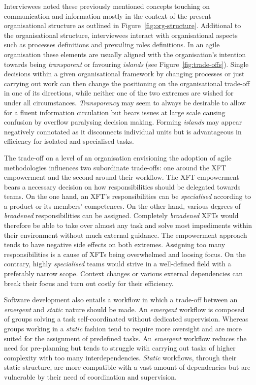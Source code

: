Interviewees noted these previously mentioned concepts touching on communication and information mostly in the context of the present organisational structure as outlined in Figure~\ref{fig:org-structure}. Additional to the organisational structure, interviewees interact with organisational aspects such as processes definitions and prevailing roles definitions. 
In an agile organisation these elements are usually aligned with the organisation's intention towards being \emph{transparent} or favouring \emph{islands} (see Figure~\ref{fig:trade-offs}).
Single decisions within a given organisational framework by changing processes or just carrying out work can then change the positioning on the organisational trade-off in one of its directions, while neither one of the two extremes are wished for under all circumstances. \emph{Transparency} may seem to always be desirable to allow for a fluent information circulation but bears issues at large scale causing confusion by overflow paralysing decision making. Forming \emph{islands} may appear negatively connotated as it disconnects individual units but is advantageous in efficiency for isolated and specialised tasks.

The trade-off on a level of an organisation envisioning the adoption of agile methodologies influences two subordinate trade-offs: one around the \ac{XFT} empowerment and the second around their workflow. The \ac{XFT} empowerment bears a necessary decision on how responsibilities should be delegated towards teams. On the one hand, an \ac{XFT}'s responsibilities can be \emph{specialised} according to a product or its members' competences. On the other hand, various degrees of \emph{broadened} responsibilities can be assigned. Completely \emph{broadened} \acp{XFT} would therefore be able to take over almost any task and solve most impediments within their environment without much external guidance. The empowerment approach tends to have negative side effects on both extremes. Assigning too many responsibilities is a cause of \acp{XFT} being overwhelmed and loosing focus. On the contrary, highly \emph{specialised} teams would strive in a well-defined field with a preferably narrow scope. Context changes or various external dependencies can break their focus and turn out costly for their efficiency.

Software development also entails a workflow in which a trade-off between an \emph{emergent} and \emph{static} nature should be made. An \emph{emergent} workflow is composed of groups solving a task self-coordinated without dedicated supervision. Whereas groups working in a \emph{static} fashion tend to require more oversight and are more suited for the assignment of predefined tasks. An \emph{emergent} workflow reduces the need for pre-planning but tends to struggle with carrying out tasks of higher complexity with too many interdependencies. \emph{Static} workflows, through their static structure, are more compatible with a vast amount of dependencies but are vulnerable by their need of coordination and supervision.

